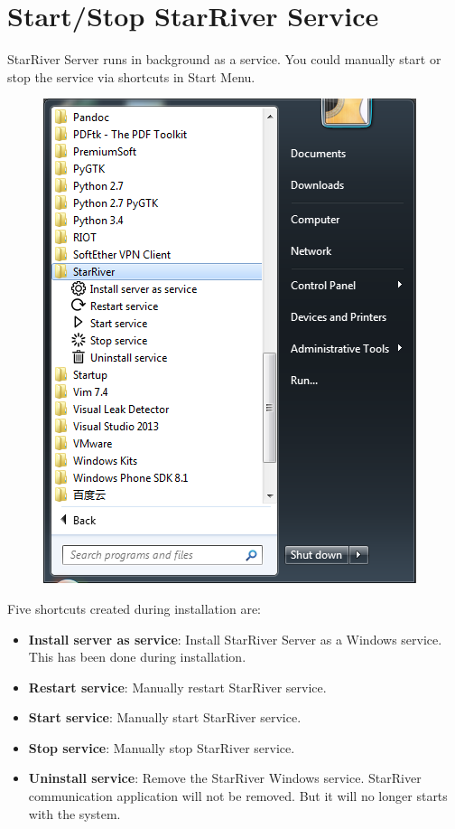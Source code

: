 \section{Start/Stop StarRiver
Service}\label{startstop-starriver-service}

StarRiver Server runs in background as a service. You could manually
start or stop the service via shortcuts in Start Menu.

\begin{figure}[htbp]
\centering
\includegraphics{img/shortcuts.png}
\end{figure}

Five shortcuts created during installation are:

\begin{itemize}
\itemsep1pt\parskip0pt
\item
  \textbf{Install server as service}: Install StarRiver Server as a
  Windows service. This has been done during installation.
\item
  \textbf{Restart service}: Manually restart StarRiver service.
\item
  \textbf{Start service}: Manually start StarRiver service.
\item
  \textbf{Stop service}: Manually stop StarRiver service.
\item
  \textbf{Uninstall service}: Remove the StarRiver Windows service.
  StarRiver communication application will not be removed. But it will
  no longer starts with the system.
\end{itemize}
